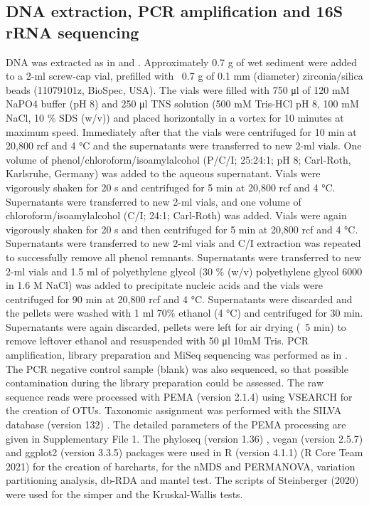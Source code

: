 \subsection{DNA extraction, PCR amplification and 16S rRNA sequencing}

   DNA was extracted as in \citep{henckel_molecular_1999} and \citep{lueders_enhanced_2004}. 
   Approximately 0.7 g of wet sediment were added to a 2-ml screw-cap vial, prefilled with ~0.7 g of 0.1 mm (diameter) zirconia/silica beads (11079101z, BioSpec, USA). 
   The vials were filled with 750 μl of 120 mM NaPO4 buffer (pH 8) and 250 μl TNS solution (500 mM Tris-HCl pH 8, 100 mM NaCl, 10 \% SDS (w/v)) and placed horizontally in a vortex for 10 minutes at maximum speed. 
   Immediately after that the vials were centrifuged for 10 min at 20,800 rcf and 4 °C and the supernatants were transferred to new 2-ml vials. 
   One volume of phenol/chloroform/isoamylalcohol (P/C/I; 25:24:1; pH 8; Carl-Roth, Karlsruhe, Germany) was added to the aqueous supernatant. 
   Vials were vigorously shaken for 20 s and centrifuged for 5 min at 20,800 rcf and 4 °C. 
   Supernatants were transferred to new 2-ml vials, and one volume of chloroform/isoamylalcohol (C/I; 24:1; Carl-Roth) was added. 
   Vials were again vigorously shaken for 20 s and then centrifuged for 5 min at 20,800 rcf and 4 °C. 
   Supernatants were transferred to new 2-ml vials and C/I extraction was repeated to successfully remove all phenol remnants. 
   Supernatants were transferred to new 2-ml vials and 1.5 ml of polyethylene glycol (30 \% (w/v) polyethylene glycol 6000 in 1.6 M NaCl) was added to precipitate nucleic acids and the vials were centrifuged for 90 min at 20,800 rcf and 4 °C. 
   Supernatants were discarded and the pellets were washed with 1 ml 70\% ethanol (4 °C) and centrifuged for 30 min. 
   Supernatants were again discarded, pellets were left for air drying (~5 min) to remove leftover ethanol and resuspended with 50 μl 10mM Tris. 
   PCR amplification, library preparation and MiSeq sequencing was performed as in \citep{pavloudi2017sediment}. 
   The PCR negative control sample (blank) was also sequenced, so that possible contamination during the library preparation could be assessed. 
   The raw sequence reads were processed with PEMA (version 2.1.4) \citep{zafeiropoulos2020pema} using VSEARCH for the creation of OTUs. 
   Taxonomic assignment was performed with the SILVA database (version 132) \citep{quast_silva_2013}. 
   The detailed parameters of the PEMA processing are given in Supplementary File 1. 
   The phyloseq (version 1.36) \citep{mcmurdie2013phyloseq}, vegan (version  2.5.7) \citep{oksanen_vegan_2020} and ggplot2 (version 3.3.5) \citep{wickham2016package} 
   packages were used in R (version 4.1.1) (R Core Team 2021) for the creation of barcharts, for the nMDS and PERMANOVA, variation partitioning analysis, db-RDA and mantel test. 
   The scripts of Steinberger (2020) \citep{steinberger_asteinberger9seq_scripts_2020} were used for the simper and the Kruskal-Wallis tests. 


